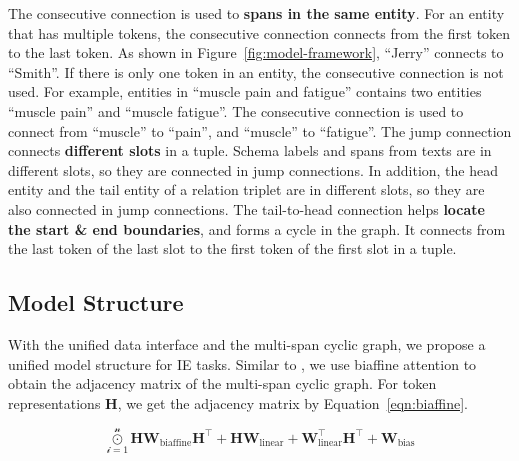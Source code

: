 The consecutive connection is used to \textbf{spans in the same entity}.
For an entity that has multiple tokens, the consecutive connection connects from the first token to the last token.
As shown in Figure~\ref{fig:model-framework}, ``Jerry'' connects to ``Smith''.
If there is only one token in an entity, the consecutive connection is not used.
For example, entities in ``muscle pain and fatigue'' contains two entities ``muscle pain'' and ``muscle fatigue''.
The consecutive connection is used to connect from ``muscle'' to ``pain'', and ``muscle'' to ``fatigue''.
The jump connection connects \textbf{different slots} in a tuple.
Schema labels and spans from texts are in different slots, so they are connected in jump connections.
In addition, the head entity and the tail entity of a relation triplet are in different slots, so they are also connected in jump connections.
The tail-to-head connection helps \textbf{locate the start \& end boundaries}, and forms a cycle in the graph.
It connects from the last token of the last slot to the first token of the first slot in a tuple.

\subsection{Model Structure}

With the unified data interface and the multi-span cyclic graph, we propose a unified model structure for IE tasks.
Similar to \citet{ner-as-dp}, we use biaffine attention to obtain the adjacency matrix of the multi-span cyclic graph.
For token representations $\mathbf{H}$, we get the adjacency matrix by Equation~\ref{eqn:biaffine}.


\begin{equation}
    \label{eqn:biaffine}
    \mathcal{\mathop{\odot}\limits_{i=1}^{n}} \mathbf{H} \mathbf{W}_{\text{biaffine}} \mathbf{H}^{\top} + \mathbf{H} \mathbf{W}_{\text{linear}} + \mathbf{W}_{\text{linear}}^{\top} \mathbf{H}^{\top} + \mathbf{W}_{\text{bias}}
\end{equation}
